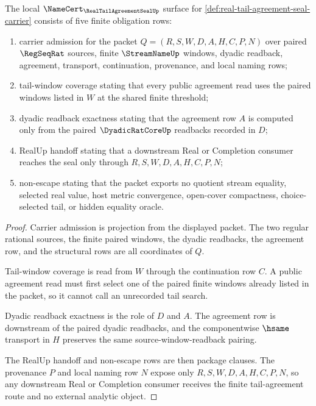 \begin{theorem}
\label{thm:real-tail-agreement-seal-namecert-obligations}
The local $\NameCert_{\RealTailAgreementSealUp}$ surface for \autoref{def:real-tail-agreement-seal-carrier} consists of five finite obligation rows:
\begin{enumerate}
\item carrier admission for the packet $Q=(R,S,W,D,A,H,C,P,N)$ over paired $\RegSeqRat$ sources, finite $\StreamNameUp$ windows, dyadic readback, agreement, transport, continuation, provenance, and local naming rows;
\item tail-window coverage stating that every public agreement read uses the paired windows listed in $W$ at the shared finite threshold;
\item dyadic readback exactness stating that the agreement row $A$ is computed only from the paired $\DyadicRatCoreUp$ readbacks recorded in $D$;
\item RealUp handoff stating that a downstream Real or Completion consumer reaches the seal only through $R,S,W,D,A,H,C,P,N$;
\item non-escape stating that the packet exports no quotient stream equality, selected real value, host metric convergence, open-cover compactness, choice-selected tail, or hidden equality oracle.
\end{enumerate}
\end{theorem}
\begin{proof}
Carrier admission is projection from the displayed packet. The two regular rational sources, the finite paired windows, the dyadic readbacks, the agreement row, and the structural rows are all coordinates of $Q$.

Tail-window coverage is read from $W$ through the continuation row $C$. A public agreement read must first select one of the paired finite windows already listed in the packet, so it cannot call an unrecorded tail search.

Dyadic readback exactness is the role of $D$ and $A$. The agreement row is downstream of the paired dyadic readbacks, and the componentwise $\hsame$ transport in $H$ preserves the same source-window-readback pairing.

The RealUp handoff and non-escape rows are then package clauses. The provenance $P$ and local naming row $N$ expose only $R,S,W,D,A,H,C,P,N$, so any downstream Real or Completion consumer receives the finite tail-agreement route and no external analytic object.
\end{proof}

